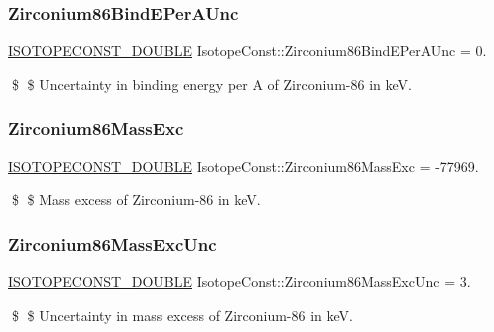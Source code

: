 \subsubsection{\texorpdfstring{Zirconium86\+Bind\+E\+Per\+A\+Unc}{Zirconium86BindEPerAUnc}}
{\footnotesize\ttfamily \mbox{\hyperlink{group___isotope_const-_macros_ga8f45a7272ce02c0b4c65c44636ed719a}{I\+S\+O\+T\+O\+P\+E\+C\+O\+N\+S\+T\+\_\+\+D\+O\+U\+B\+LE}} Isotope\+Const\+::\+Zirconium86\+Bind\+E\+Per\+A\+Unc = 0.}

\$ \$ Uncertainty in binding energy per A of Zirconium-\/86 in keV. \mbox{\label{group___isotope_const-_zirconium-_zr86_ga79c100ae698b5f92f9c1237f2c8d9fcb}} 
\subsubsection{\texorpdfstring{Zirconium86\+Mass\+Exc}{Zirconium86MassExc}}
{\footnotesize\ttfamily \mbox{\hyperlink{group___isotope_const-_macros_ga8f45a7272ce02c0b4c65c44636ed719a}{I\+S\+O\+T\+O\+P\+E\+C\+O\+N\+S\+T\+\_\+\+D\+O\+U\+B\+LE}} Isotope\+Const\+::\+Zirconium86\+Mass\+Exc = -\/77969.}

\$ \$ Mass excess of Zirconium-\/86 in keV. \mbox{\label{group___isotope_const-_zirconium-_zr86_ga0184661f264f37594544e0fbbd2ff0c4}} 
\subsubsection{\texorpdfstring{Zirconium86\+Mass\+Exc\+Unc}{Zirconium86MassExcUnc}}
{\footnotesize\ttfamily \mbox{\hyperlink{group___isotope_const-_macros_ga8f45a7272ce02c0b4c65c44636ed719a}{I\+S\+O\+T\+O\+P\+E\+C\+O\+N\+S\+T\+\_\+\+D\+O\+U\+B\+LE}} Isotope\+Const\+::\+Zirconium86\+Mass\+Exc\+Unc = 3.}

\$ \$ Uncertainty in mass excess of Zirconium-\/86 in keV. \mbox{\label{group___isotope_const-_zirconium-_zr86_ga95b9bd5665231e8b9aa6d4bc764c62ff}} 
